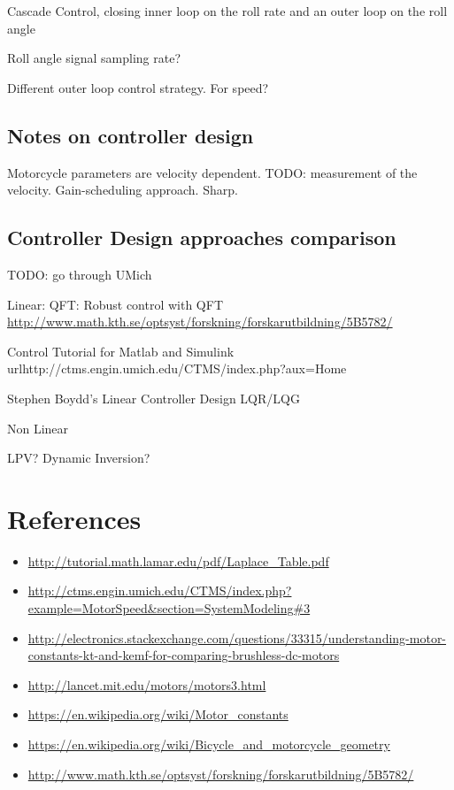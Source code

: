 \documentclass[11pt]{article}
\begin{document}
Cascade Control, closing inner loop on the roll rate and an outer loop on the roll angle

Roll angle signal sampling rate?

Different outer loop control strategy. For speed?

\subsection{Notes on controller design}
Motorcycle parameters are velocity dependent. TODO: measurement of the velocity. Gain-scheduling approach. Sharp.

\subsection{Controller Design approaches comparison}
TODO: go through UMich

Linear:
QFT: Robust control with QFT
\url{http://www.math.kth.se/optsyst/forskning/forskarutbildning/5B5782/}


Control Tutorial for Matlab and Simulink
url{http://ctms.engin.umich.edu/CTMS/index.php?aux=Home}

Stephen Boydd's Linear Controller Design
LQR/LQG



Non Linear

LPV?
Dynamic Inversion?
\section{References}
\begin{itemize}
\item \url{http://tutorial.math.lamar.edu/pdf/Laplace_Table.pdf}
\item \url{http://ctms.engin.umich.edu/CTMS/index.php?example=MotorSpeed&section=SystemModeling#3}
\item \url{http://electronics.stackexchange.com/questions/33315/understanding-motor-constants-kt-and-kemf-for-comparing-brushless-dc-motors}
\item \url{http://lancet.mit.edu/motors/motors3.html}
\item \url{https://en.wikipedia.org/wiki/Motor_constants}
\item \url{https://en.wikipedia.org/wiki/Bicycle_and_motorcycle_geometry}
\item \url{http://www.math.kth.se/optsyst/forskning/forskarutbildning/5B5782/}
\end{itemize}
\end{document}

